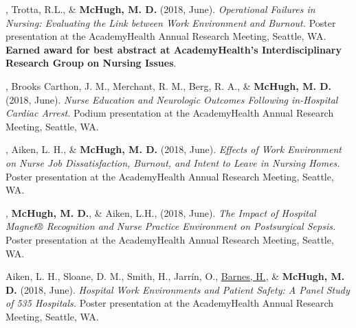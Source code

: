 \documentclass[10pt,]{article}
\begin{document}
{{{{{{{{{{{{{{{\begin{hangparas}{.25in}{1}
, Trotta, R.L., \& {\textbf {McHugh, M. D.}} (2018, June). {\textit {Operational Failures in Nursing: Evaluating the Link between Work Environment and Burnout.}} Poster presentation at the AcademyHealth Annual Research Meeting, Seattle, WA. {\textbf {Earned award for best abstract at AcademyHealth's Interdisciplinary Research Group on Nursing Issues}}.

\end{hangparas}


\begin{hangparas}{.25in}{1}

, Brooks Carthon, J. M., Merchant, R. M., Berg, R. A., \& {\textbf {McHugh, M. D.}} (2018, June). {\textit {Nurse Education and Neurologic Outcomes Following in-Hospital Cardiac Arrest.}} Podium presentation at the AcademyHealth Annual Research Meeting, Seattle, WA.

\end{hangparas}



\begin{hangparas}{.25in}{1}

, Aiken, L. H., \& {\textbf {McHugh, M. D.}} (2018, June). {\textit {Effects of Work Environment on Nurse Job Dissatisfaction, Burnout, and Intent to Leave in Nursing Homes.}} Poster presentation at the AcademyHealth Annual Research Meeting, Seattle, WA.

\end{hangparas}



\begin{hangparas}{.25in}{1}

, {\textbf {McHugh, M. D.}}, \& Aiken, L.H., (2018, June). {\textit {The Impact of Hospital Magnet® Recognition and Nurse Practice Environment on Postsurgical Sepsis.}} Poster presentation at the AcademyHealth Annual Research Meeting, Seattle, WA.

\end{hangparas}



\begin{hangparas}{.25in}{1}

\*Aiken, L. H., Sloane, D. M., Smith, H., Jarrín, O., {\underline {Barnes, H.}}, \& {\textbf {McHugh, M. D.}} (2018, June). {\textit {Hospital Work Environments and Patient Safety: A Panel Study of 535 Hospitals.}} Poster presentation at the AcademyHealth Annual Research Meeting, Seattle, WA.


\end{hangparas}}}}}}}}}}}}}}}}
\end{document}
